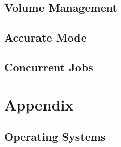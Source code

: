 \documentclass[10pt,a4paper]{book}
\begin{document}




\chapter{Volume Management}
  
  









\chapter{Accurate Mode}
    \label{accuratemode}



\chapter{Concurrent Jobs}
    \label{ConcurrentJobs}













\appendix
\part{Appendix}



\chapter{Operating Systems}
\label{SupportedOSes}

    

%
%

%
\end{document}
